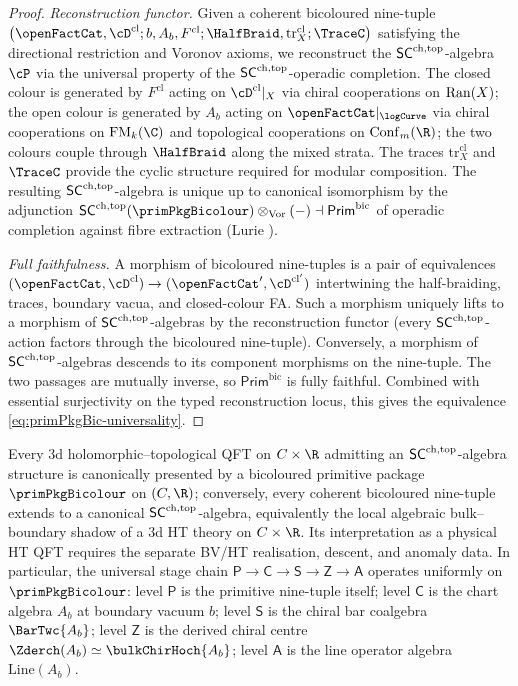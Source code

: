 \begin{proof}
\emph{Reconstruction functor.}
Given a coherent bicoloured nine-tuple $\bigl(\openFactCat,
\cD^{\mathrm{cl}}; b, A_b, F^{\mathrm{cl}}; \HalfBraid,
\mathrm{tr}^{\mathrm{cl}}_X; \TraceC\bigr)$ satisfying the
directional restriction and Voronov axioms, we reconstruct the
$\mathsf{SC}^{\mathrm{ch},\mathrm{top}}$-algebra $\cP$ via the universal property of the
$\mathsf{SC}^{\mathrm{ch},\mathrm{top}}$-operadic completion. The closed colour is generated by
$F^{\mathrm{cl}}$ acting on $\cD^{\mathrm{cl}}|_X$ via chiral
cooperations on $\mathrm{Ran}(X)$; the open colour is generated by $A_b$
acting on $\openFactCat|_{\logCurve}$ via chiral cooperations on
$\FM_k(\C)$ and topological cooperations on $\Conf_m(\R)$; the
two colours couple through $\HalfBraid$ along the mixed strata.
The traces $\mathrm{tr}^{\mathrm{cl}}_X$ and $\TraceC$ provide the
cyclic structure required for modular composition. The resulting
$\mathsf{SC}^{\mathrm{ch},\mathrm{top}}$-algebra is unique up to canonical isomorphism by the
adjunction
$\SCchtop(\primPkgBicolour) \otimes_{\mathrm{Vor}} (-) \dashv
\mathsf{Prim}^{\mathrm{bic}}$
of operadic completion against fibre extraction
\textup(Lurie \cite[Theorem 5.5.4.10]{HA}\textup).

\emph{Full faithfulness.}
A morphism of bicoloured nine-tuples is a pair of equivalences
$(\openFactCat, \cD^{\mathrm{cl}}) \to ({\openFactCat}',
\cD^{\mathrm{cl}'})$ intertwining the half-braiding, traces,
boundary vacua, and closed-colour FA. Such a morphism uniquely
lifts to a morphism of $\mathsf{SC}^{\mathrm{ch},\mathrm{top}}$-algebras by the reconstruction
functor \textup(every
$\mathsf{SC}^{\mathrm{ch},\mathrm{top}}$-action factors through the bicoloured nine-tuple\textup).
Conversely, a morphism of $\mathsf{SC}^{\mathrm{ch},\mathrm{top}}$-algebras descends to its
component morphisms on the nine-tuple. The two passages are mutually
inverse, so $\mathsf{Prim}^{\mathrm{bic}}$ is fully faithful.
Combined with essential surjectivity on the typed reconstruction locus, this gives the
equivalence \eqref{eq:primPkgBic-universality}.
\end{proof}

\begin{corollary}
\label{cor:bicoloured-primitive-universality-3dHT}
Every $3$d holomorphic--topological QFT on $C \times \R$ admitting
an $\mathsf{SC}^{\mathrm{ch},\mathrm{top}}$-algebra structure is canonically presented by a
bicoloured primitive package $\primPkgBicolour$ on $(C, \R)$;
conversely, every coherent bicoloured nine-tuple extends to a
canonical $\mathsf{SC}^{\mathrm{ch},\mathrm{top}}$-algebra, equivalently the local algebraic
bulk--boundary shadow of a $3$d HT theory on $C \times \R$. Its
interpretation as a physical HT QFT requires the separate BV/HT
realisation, descent, and anomaly data. In particular, the
universal stage chain
$\mathsf{P} \to \mathsf{C} \to \mathsf{S} \to \mathsf{Z} \to \mathsf{A}$
operates uniformly on $\primPkgBicolour$: level $\mathsf{P}$ is the
primitive nine-tuple itself; level $\mathsf{C}$ is the chart
algebra $A_b$ at boundary vacuum $b$; level $\mathsf{S}$ is the
chiral bar coalgebra $\BarTwc{A_b}$; level $\mathsf{Z}$ is the
derived chiral centre $\Zderch(A_b) \simeq \bulkChirHoch{A_b}$;
level $\mathsf{A}$ is the line operator algebra
$\mathrm{Line}(A_b)$.
\end{corollary}

